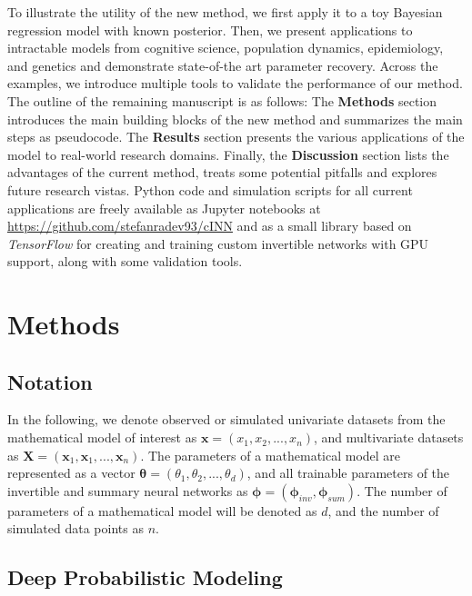 \documentclass[9pt,twoside,lineno]{pnas-new}
\begin{document}
To illustrate the utility of the new method, we first apply it to a toy Bayesian regression model with known posterior. Then, we present applications to intractable models from cognitive science, population dynamics, epidemiology, and genetics and demonstrate state-of-the art parameter recovery. Across the examples, we introduce multiple tools to validate the performance of our method. The outline of the remaining manuscript is as follows: The \textbf{Methods} section introduces the main building blocks of the new method and summarizes the main steps as pseudocode. The \textbf{Results} section presents the various applications of the model to real-world research domains. Finally, the \textbf{Discussion} section lists the advantages of the current method, treats some potential pitfalls and explores future research vistas. Python code and simulation scripts for all current applications are freely available as Jupyter notebooks at \href{https://github.com/stefanradev93/cINN}{https://github.com/stefanradev93/cINN} and as a small library based on \textit{TensorFlow} \cite{abadi2016tensorflow} for creating and training custom invertible networks with GPU support, along with some validation tools. 

\section*{Methods}

\subsection*{Notation}

In the following, we denote observed or simulated univariate datasets from the mathematical model of interest as $\boldsymbol{x} = (x_{1}, x_{2},...,x_{n})$, and multivariate datasets as $\boldsymbol{X} = (\boldsymbol{x}_{1}, \boldsymbol{x}_{1},...,\boldsymbol{x}_{n})$. The parameters of a mathematical model are represented as a vector $\boldsymbol{\theta} = (\theta_{1}, \theta_{2},...,\theta_{d})$, and all trainable parameters of the invertible and summary neural networks as $\boldsymbol{\phi} = (\boldsymbol{\phi}_{inv}, \boldsymbol{\phi}_{sum})$. The number of parameters of a mathematical model will be denoted as $d$, and the number of simulated data points as $n$.

\subsection*{Deep Probabilistic Modeling}
\end{document}
